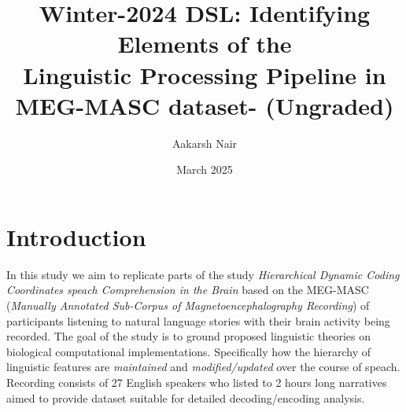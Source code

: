 \documentclass{tufte-handout}
\title{Winter-2024 DSL: Identifying Elements of the\\ Linguistic Processing Pipeline in MEG-MASC dataset- (Ungraded)}
\author{Aakarsh Nair}
\date{March 2025}
\begin{document}
\maketitle

\iffalse
A complete project proposal should contain the following elements: ▷ concise and descriptive title, information about contributors ▷ an introduction laying out the research question, providing the essential context and background information about the topic ▷ a clear statement of the objective: research question to be answered, result to replicate ▷ preliminary literature review showing that you have an idea of what is out there in terms of both methods and datasets, and where to look for ideas and examples in case you get stuck ▷ considerations of scope: which aspects will be included in and excluded from the study, and what are the reasons for the decisions? (most commonly: data availability, time constraints) ▷ proposed methodology: what are your plans for data acquisition, and which techniques are you planning to apply to your data in order to answer the research question? ▷ preliminary project plan laying out the work each project contributor is planning to do in which week, and how this means the work will be completed as the deadline approaches ▷ a statement of the expected outcomes: what will we able to learn from the project results? What could we conclude from a failed replication or lack of evidence for your hypothesis?

\fi

\section{Introduction}

In this study we aim to replicate parts of the study \citep{Gwilliams2024.04.19.590280} \emph{Hierarchical Dynamic Coding Coordinates speach Comprehension in the Brain} based on the MEG-MASC \citep{gwilliams2022megmaschighqualitymagnetoencephalographydataset} (\emph{Manually Annotated Sub-Corpus of Magnetoencephalography Recording}) of participants listening to natural language stories with their brain activity being recorded. The goal of the study is to ground proposed linguistic theories on biological computational implementations. Specifically how the hierarchy of linguistic features are \emph{maintained} and \emph{modified/updated} over the course of speach. Recording consists of 27 English speakers who listed to 2 hours long narratives aimed to provide dataset suitable for detailed decoding/encoding analysis. 
\end{document}

